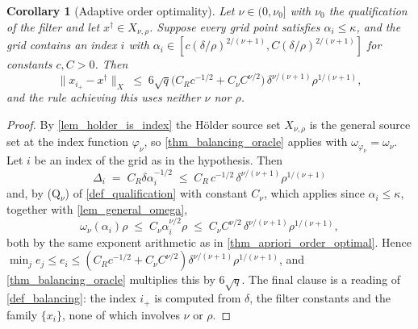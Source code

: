 \documentclass[a4paper]{report}
\theoremstyle{plain}
\newtheorem{corollary}[theorem]{Corollary}
\theoremstyle{definition}
\theoremstyle{remark}
\newcommand{\dg}{^{\dagger}}
\begin{document}
\begin{corollary}[Adaptive order optimality]
  \label{cor_balancing_adaptive}
  Let $\nu \in (0,\nu_0]$ with $\nu_0$ the qualification of the filter and let
  $x\dg \in X_{\nu,\rho}$.  Suppose every grid point satisfies $\alpha_i \le \kappa$, and
  the grid contains an index $i$ with
  $\alpha_i \in [c(\delta/\rho)^{2/(\nu+1)}, C(\delta/\rho)^{2/(\nu+1)}]$ for constants
  $c, C > 0$.  Then
  \[
    \|x_{i_{+}} - x\dg\|_X \;\le\;
      6\sqrt{q}\bigl(C_R c^{-1/2}+C_{\nu}C^{\nu/2}\bigr)\,
      \delta^{\nu/(\nu+1)}\rho^{1/(\nu+1)} ,
  \]
  and the rule achieving this uses neither $\nu$ nor $\rho$.
\end{corollary}
\begin{proof}
  By \cref{lem_holder_is_index} the H\"older source set $X_{\nu,\rho}$ is the general
  source set at the index function $\varphi_{\nu}$, so \cref{thm_balancing_oracle}
  applies with $\omega_{\varphi_{\nu}} = \omega_{\nu}$.  Let $i$ be an index of the grid
  as in the hypothesis.  Then
  \[
    \Delta_i \;=\; C_R\delta\alpha_i^{-1/2}
      \;\le\; C_R\,c^{-1/2}\,\delta^{\nu/(\nu+1)}\rho^{1/(\nu+1)}
  \]
  and, by (Q$_{\nu}$) of \cref{def_qualification} with constant $C_{\nu}$, which applies
  since $\alpha_i \le \kappa$, together with \cref{lem_general_omega},
  \[
    \omega_{\nu}(\alpha_i)\rho \;\le\; C_{\nu}\alpha_i^{\nu/2}\rho
      \;\le\; C_{\nu}C^{\nu/2}\,\delta^{\nu/(\nu+1)}\rho^{1/(\nu+1)} ,
  \]
  both by the same exponent arithmetic as in \cref{thm_apriori_order_optimal}.  Hence
  $\min_j e_j \le e_i \le (C_Rc^{-1/2}+C_{\nu}C^{\nu/2})
  \delta^{\nu/(\nu+1)}\rho^{1/(\nu+1)}$, and \cref{thm_balancing_oracle} multiplies this
  by $6\sqrt{q}$.  The final clause is a reading of \cref{def_balancing}: the index
  $i_{+}$ is computed from $\delta$, the filter constants and the family $\{x_i\}$, none
  of which involves $\nu$ or $\rho$.
\end{proof}
\end{document}
